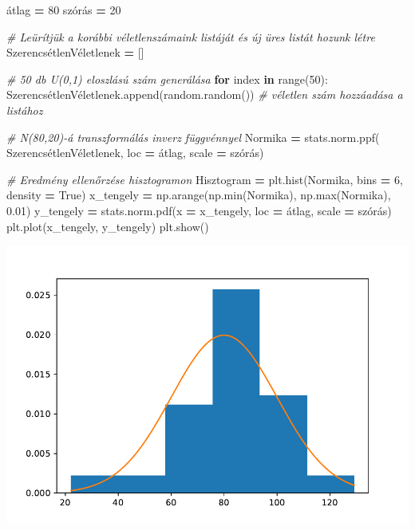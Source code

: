 \documentclass[
]{book}
\newenvironment{Shaded}{\begin{snugshade}}{\end{snugshade}}
\newcommand{\BuiltInTok}[1]{#1}
\newcommand{\CommentTok}[1]{\textcolor[rgb]{0.56,0.35,0.01}{\textit{#1}}}
\newcommand{\ControlFlowTok}[1]{\textcolor[rgb]{0.13,0.29,0.53}{\textbf{#1}}}
\newcommand{\DecValTok}[1]{\textcolor[rgb]{0.00,0.00,0.81}{#1}}
\newcommand{\FloatTok}[1]{\textcolor[rgb]{0.00,0.00,0.81}{#1}}
\newcommand{\KeywordTok}[1]{\textcolor[rgb]{0.13,0.29,0.53}{\textbf{#1}}}
\newcommand{\NormalTok}[1]{#1}
\newcommand{\OperatorTok}[1]{\textcolor[rgb]{0.81,0.36,0.00}{\textbf{#1}}}
\newcommand{\VariableTok}[1]{\textcolor[rgb]{0.00,0.00,0.00}{#1}}
\begin{document}
\begin{Shaded}
\begin{Highlighting}[]
\NormalTok{átlag }\OperatorTok{=} \DecValTok{80}
\NormalTok{szórás }\OperatorTok{=} \DecValTok{20}

\CommentTok{\# Leürítjük a korábbi véletlenszámaink listáját és új üres listát hozunk létre}
\NormalTok{SzerencsétlenVéletlenek }\OperatorTok{=}\NormalTok{ []}

\CommentTok{\# 50 db U(0,1) eloszlású szám generálása}
\ControlFlowTok{for}\NormalTok{ index }\KeywordTok{in} \BuiltInTok{range}\NormalTok{(}\DecValTok{50}\NormalTok{):}
\NormalTok{  SzerencsétlenVéletlenek.append(random.random()) }\CommentTok{\# véletlen szám hozzáadása a listához}

\CommentTok{\# N(80,20){-}á transzformálás inverz függvénnyel}
\NormalTok{Normika }\OperatorTok{=}\NormalTok{ stats.norm.ppf(}
\NormalTok{  SzerencsétlenVéletlenek,}
\NormalTok{  loc }\OperatorTok{=}\NormalTok{ átlag,}
\NormalTok{  scale }\OperatorTok{=}\NormalTok{ szórás)}

\CommentTok{\# Eredmény ellenőrzése hisztogramon}
\NormalTok{Hisztogram }\OperatorTok{=}\NormalTok{ plt.hist(Normika, bins }\OperatorTok{=} \DecValTok{6}\NormalTok{, density }\OperatorTok{=} \VariableTok{True}\NormalTok{)}
\NormalTok{x\_tengely }\OperatorTok{=}\NormalTok{ np.arange(np.}\BuiltInTok{min}\NormalTok{(Normika), np.}\BuiltInTok{max}\NormalTok{(Normika), }\FloatTok{0.01}\NormalTok{)}
\NormalTok{y\_tengely }\OperatorTok{=}\NormalTok{ stats.norm.pdf(x }\OperatorTok{=}\NormalTok{ x\_tengely, loc }\OperatorTok{=}\NormalTok{ átlag, scale }\OperatorTok{=}\NormalTok{ szórás)}
\NormalTok{plt.plot(x\_tengely, y\_tengely)}
\NormalTok{plt.show()}
\end{Highlighting}
\end{Shaded}

\includegraphics{_main_files/figure-latex/unnamed-chunk-208-9.pdf}
\end{document}
